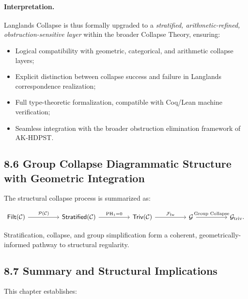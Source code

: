 \documentclass[11pt]{article}
\begin{document}
\paragraph{Interpretation.}

Langlands Collapse is thus formally upgraded to a \emph{stratified, arithmetic-refined, obstruction-sensitive layer} within the broader Collapse Theory, ensuring:

\begin{itemize}
    \item Logical compatibility with geometric, categorical, and arithmetic collapse layers;
    \item Explicit distinction between collapse success and failure in Langlands correspondence realization;
    \item Full type-theoretic formalization, compatible with Coq/Lean machine verification;
    \item Seamless integration with the broader obstruction elimination framework of AK-HDPST.
\end{itemize}


\subsection*{8.6 Group Collapse Diagrammatic Structure with Geometric Integration}

The structural collapse process is summarized as:

\[
\begin{tikzcd}[column sep=huge]
\mathsf{Filt}(\mathcal{C}) \arrow[r, "\mathcal{P}(\mathcal{C})"]
& \mathsf{Stratified}(\mathcal{C}) \arrow[r, "\mathrm{PH}_1 = 0"]
& \mathsf{Triv}(\mathcal{C}) \arrow[r, "\mathcal{F}_{\mathrm{Iw}}"]
& \mathcal{G} \arrow[r, "\text{Group Collapse}"]
& \mathcal{G}_{\mathrm{triv}}.
\end{tikzcd}
\]

Stratification, collapse, and group simplification form a coherent, geometrically-informed pathway to structural regularity.

\subsection*{8.7 Summary and Structural Implications}

This chapter establishes:
\end{document}
